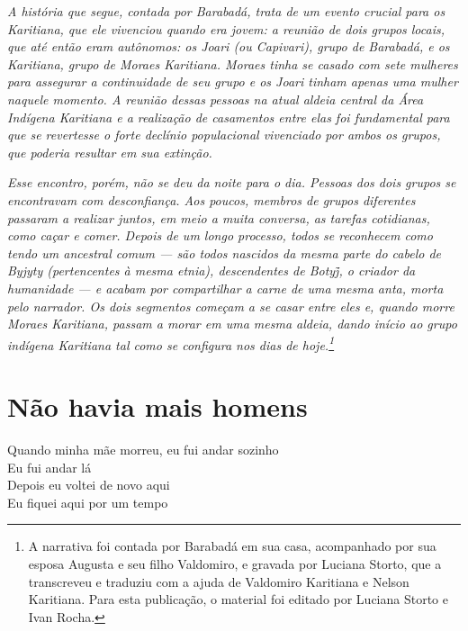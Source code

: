 \thispagestyle{empty}
\mbox{}
\vfill
\noindent{}\textit{A história que segue, contada por Barabadá, trata de um evento crucial para os Karitiana, que ele vivenciou quando era jovem: a reunião de dois grupos locais, que até então eram autônomos: os Joari (ou Capivari), grupo de Barabadá, e os Karitiana, grupo de Moraes Karitiana. Moraes tinha se casado com sete mulheres para assegurar a continuidade de seu grupo e os Joari tinham apenas uma mulher naquele momento. A reunião dessas pessoas na atual aldeia central da Área Indígena Karitiana e a realização de casamentos entre elas foi fundamental para que se revertesse o forte declínio populacional vivenciado por ambos os grupos, que poderia resultar em sua extinção.}

\textit{Esse encontro, porém, não se deu da noite para o dia. Pessoas dos dois grupos se encontravam com desconfiança. Aos poucos, membros de grupos diferentes passaram a realizar juntos, em meio a muita conversa, as tarefas cotidianas, como caçar e comer. Depois de um longo processo, todos se reconhecem como tendo um ancestral comum --- são todos nascidos da mesma parte do cabelo de Byjyty (pertencentes à mesma etnia), descendentes de Botyj̃, o criador da humanidade --- e acabam por compartilhar a carne de uma mesma anta, morta pelo narrador. Os dois segmentos começam a se casar entre eles e, quando morre Moraes Karitiana, passam a morar em uma mesma aldeia, dando início ao grupo indígena Karitiana tal como se configura nos dias de hoje.\footnote{A narrativa foi contada por Barabadá em sua casa, acompanhado por sua esposa Augusta e seu filho Valdomiro, e gravada por Luciana Storto, que a transcreveu e traduziu com a ajuda de Valdomiro Karitiana e Nelson Karitiana. Para esta publicação, o material foi editado por Luciana Storto e Ivan Rocha.}}
\pagebreak


\chapter*{Não havia mais homens} 

\begin{linenumbers}\begingroup\raggedright
  \noindent Quando minha mãe morreu, eu fui andar sozinho\\
  Eu fui andar lá\\
  Depois eu voltei de novo aqui\\
  Eu fiquei aqui por um tempo
 
\end{linenumbers}\endgroup

